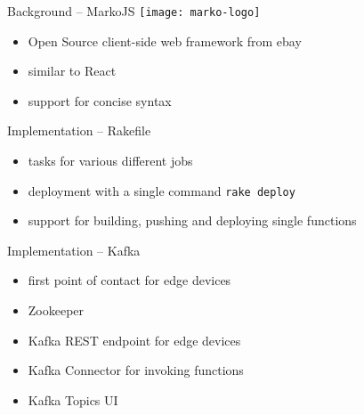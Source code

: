 \documentclass[aspectratio=1610]{beamer}
\begin{document}
  \begin{frame}{Background -- MarkoJS}
    \texttt{[image: marko-logo]}

    \vspace*{2em}

    \begin{itemize}
      \item Open Source client-side web framework from ebay
      \item similar to React
      \item support for concise syntax
    \end{itemize}
  \end{frame}

  \begin{frame}{Implementation -- Rakefile}
    \begin{itemize}
      \item tasks for various different jobs
      \item deployment with a single command \lstinline{rake deploy}
      \item support for building, pushing and deploying single functions
    \end{itemize}
  \end{frame}

  \begin{frame}{Implementation -- Kafka}
    \begin{itemize}
      \item first point of contact for edge devices
      \item Zookeeper
      \item Kafka REST endpoint for edge devices
      \item Kafka Connector for invoking functions
      \item Kafka Topics UI
    \end{itemize}
  \end{frame}
\end{document}
